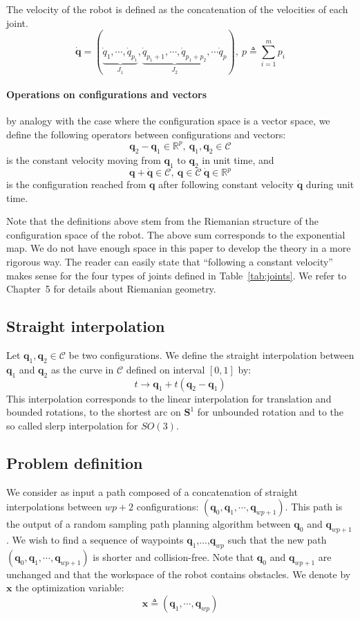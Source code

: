 \documentclass{tADR2e}
\newcommand\real{\mathbb{R}}
\newcommand\CS{\mathcal{C}}
\newcommand\Sone{\mathbf{S}^1}
\newcommand\conf{\mathbf{q}}
\newcommand\xx{\mathbf{x}} %
\begin{document}
The velocity of the robot is defined as the concatenation of the velocities of 
each joint.
$$\dot{\conf} = (\underbrace{\dot{q}_{1},\cdots,\dot{q}_{p_1}}_{J_1},
\underbrace{\dot{q}_{p_1+1},\cdots,\dot{q}_{p_1+p_2}}_{J_2},\cdots \dot{q}_p),\ p
\triangleq\sum_{i=1}^m p_i$$

\paragraph {Operations on configurations and vectors} by analogy with the case 
where the configuration space is a vector space, we define the following 
operators between configurations and vectors:
$$
\conf_2 - \conf_1 \in \real^p, \ \conf_1, \conf_2\in\CS
$$
is the constant velocity moving from $\conf_1$ to $\conf_2$ in unit time, and
$$
\conf + \dot{\conf}\in\CS, \ \conf\in\CS \ \dot{\conf}\in\real^p
$$
is the configuration reached from $\conf$ after following constant velocity $
\dot{\conf}$ during unit time.

Note that the definitions above stem from the Riemanian structure of the 
configuration space of the robot. The above sum corresponds to the exponential 
map. We do not have enough space in this paper to develop the theory in a more 
rigorous way. The reader can easily state that ``following a 
constant velocity'' makes sense for the four types of joints defined in 
Table~\ref{tab:joints}. We refer to~\cite{riemanian-optim2008} Chapter~5 for 
details about Riemanian geometry.

\subsection {Straight interpolation}

Let $\conf_1, \conf_2\in\CS$ be two configurations. We define the straight 
interpolation between $\conf_1$ and $\conf_2$ as the curve in $\CS$ defined on 
interval $[0,1]$ by:
$$
t \rightarrow \conf_1 + t (\conf_2 - \conf_1)
$$
This interpolation corresponds to the linear interpolation for translation and 
bounded rotations, to the shortest arc on $\Sone$ for unbounded rotation and to 
the so called slerp interpolation for $SO(3)$.

\subsection{Problem definition}

We consider as input a path composed of a concatenation of straight 
interpolations between $wp+2$ configurations: $(\conf_0, \conf_1,\cdots,\conf_{wp
+1})$. This path is the output of a random sampling path planning algorithm 
between $\conf_0$ and $\conf_{wp+1}$. We wish to find a sequence of waypoints $
\conf_{1}$,...,$\conf_{wp}$ such that the new path $(\conf_0, \conf_1,\cdots,
\conf_{wp+1})$ is shorter and collision-free. Note that $\conf_0$ and $\conf_{wp
+1}$ are unchanged and that the workspace of the robot contains obstacles. We 
denote by $\xx$ the optimization variable:
$$
\xx \triangleq (\conf_1,\cdots,\conf_{wp})
$$
\end{document}
